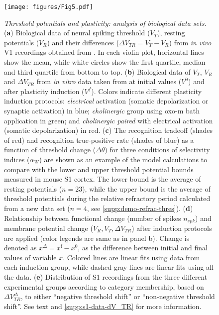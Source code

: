 \begin{figure}[H]
    \centering
    \texttt{[image: figures/Fig5.pdf]}
    \caption{
    \textit{Threshold potentials and plasticity: analysis of biological data sets}.
    (\textbf{a}) Biological data of
            neural spiking threshold ($V_T$),
            resting potentials ($V_R$)
            and their differences  ($\Delta V_{TR} = V_T - V_R$)
        from \textit{in vivo} V1 recordings
            obtained from \cite{Li2020-ej}.
        In each violin plot,
            horizontal lines show the mean,
            while white circles show
                the first quartile, median and third quartile from bottom to top.
    (\textbf{b}) Biological data of $V_T$, $V_R$ and $\Delta V_{TR}$
        from \textit{in vitro} data taken from \cite{Gill2020-wy}
        at initial values ($V^0$)
        and after plasticity induction ($V^f$).
        Colors indicate different plasticity induction protocols:
            \textit{electrical} activation (somatic depolarization or synaptic activation) in blue;
            \textit{cholinergic} group using oxo-m bath application in green;
            and \textit{cholinergic paired} with electrical activation (somatic depolarization) in red.
    (\textbf{c}) The recognition tradeoff (shades of red)
            and recognition true-positive rate (shades of blue)
            as a function of threshold change ($\Delta\theta$)
            for three conditions of selectivity indices ($\alpha_W$)
        are shown as an example of the model calculations
            to compare with the lower and upper threshold potential bounds measured in mouse S1 cortex.
        The lower bound is the average of resting potentials ($n = 23$),
            while the upper bound is the average of threshold potentials
                during the relative refractory period calculated from a new data set
                ($n = 4$, see \autoref{supp:demo-refrac-thres}).
    (\textbf{d}) Relationship between functional change (number of spikes $n_{spk}$)
            and membrane potential change ($V_R, V_T, \Delta V_{TR}$)
            after induction protocols are applied (color legends are same as in panel b).
        Change is denoted as
            $x^{\Delta} = x^{\mathrm{f}} - x^{\mathrm{0}}$,
            as the difference between initial and final values of variable $x$.
        Colored lines are linear fits using data from each induction group,
            while dashed gray lines are linear fits using all the data.
    (\textbf{e})
    Distribution of S1 recordings
        from the three different experimental groups
        according to category membership,
        based on $\Delta V_{TR}^{\Delta}$,
        to either
        ``negative threshold shift''
        or ``non-negative threshold shift''.
        See text and \autoref{supp:s1-data-dV_TR} for more information.
    }
    \label{fig:ffwd-biol-data}
\end{figure}

